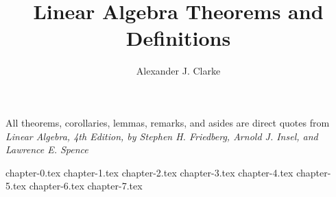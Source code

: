 \documentclass[12pt,letterpaper]{report}
\author{Alexander J. Clarke}
\title{Linear Algebra Theorems and Definitions}
\begin{document}
\maketitle
\clearpage
\begin{center}
	\thispagestyle{empty}
	\vspace*{\fill}
	All theorems, corollaries, lemmas, remarks, and asides are direct quotes from\\

	\textit{Linear Algebra, 4th Edition, by Stephen H. Friedberg, Arnold J. Insel, and Lawrence E. Spence}
	\vspace*{\fill}
\end{center}
\tableofcontents

{chapter-0.tex}
{chapter-1.tex}
{chapter-2.tex}
{chapter-3.tex}
{chapter-4.tex}
{chapter-5.tex}
{chapter-6.tex}
{chapter-7.tex}
\end{document}
